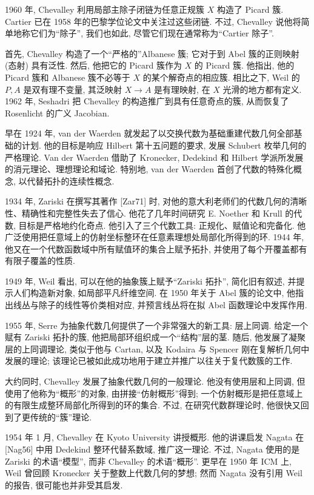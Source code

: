 1960 年, Chevalley 利用局部主除子闭链为任意正规簇 $X$ 构造了 Picard 簇. Cartier 已在 1958 年的巴黎学位论文中关注过这些闭链. 不过, Chevalley 说他将简单地称它们为“除子”, 我们也如此, 尽管它们现在通常称为“Cartier 除子”.

首先, Chevalley 构造了一个“严格的”Albanese 簇; 它对于到 Abel 簇的正则映射 (态射) 具有泛性. 然后, 他把它的 Picard 簇作为 $X$ 的 Picard 簇. 他指出, 他的 Picard 簇和 Albanese 簇不必等于 $X$ 的某个解奇点的相应簇. 相比之下, Weil 的 $P,A$ 是双有理不变量, 其泛映射 $X\to A$ 是有理映射, 在 $X$ 光滑的地方都有定义. 1962 年, Seshadri 把 Chevalley 的构造推广到具有任意奇点的簇, 从而恢复了 Rosenlicht 的广义 Jacobian.

早在 1924 年, van der Waerden 就发起了以交换代数为基础重建代数几何全部基础的计划. 他的目标是响应 Hilbert 第十五问题的要求, 发展 Schubert 枚举几何的严格理论. Van der Waerden 借助了 Kronecker, Dedekind 和 Hilbert 学派所发展的消元理论、理想理论和域论. 特别地, van der Waerden 首创了代数的特殊化概念, 以代替拓扑的连续性概念.

1934 年, Zariski 在撰写其著作 [Zar71] 时, 对他的意大利老师们的代数几何的清晰性、精确性和完整性失去了信心. 他花了几年时间研究 E. Noether 和 Krull 的代数, 目标是严格地约化奇点. 他引入了三个代数工具: 正规化、赋值论和完备化. 他广泛使用把任意域上的仿射坐标整环在任意素理想处局部化所得到的环. 1944 年, 他又在一个代数函数域中所有赋值环的集合上赋予拓扑, 并使用了每个开覆盖都有有限子覆盖的性质.

1949 年, Weil 看出, 可以在他的抽象簇上赋予“Zariski 拓扑”, 简化旧有叙述, 并提示人们构造新对象, 如局部平凡纤维空间. 在 1950 年关于 Abel 簇的论文中, 他指出线丛与除子的线性等价类相对应, 并预言线丛将在拟 Abel 函数理论中发挥作用.

1955 年, Serre 为抽象代数几何提供了一个非常强大的新工具: 层上同调. 给定一个赋有 Zariski 拓扑的簇, 他把局部环组织成一个“结构”层的茎. 随后, 他发展了凝聚层的上同调理论, 类似于他与 Cartan, 以及 Kodaira 与 Spencer 刚在复解析几何中发展的理论; 该理论已被如此成功地用于建立并推广以往关于复代数簇的工作.

大约同时, Chevalley 发展了抽象代数几何的一般理论. 他没有使用层和上同调, 但使用了他称为“概形”的对象, 由拼接“仿射概形”得到; 一个仿射概形是把任意域上的有限生成整环局部化所得到的环的集合. 不过, 在研究代数群理论时, 他很快又回到了更传统的“簇”理论.

1954 年 1 月, Chevalley 在 Kyoto University 讲授概形. 他的讲课启发 Nagata 在 [Nag56] 中用 Dedekind 整环代替系数域, 推广这一理论. 不过, Nagata 使用的是 Zariski 的术语“模型”, 而非 Chevalley 的术语“概形”. 更早在 1950 年 ICM 上, Weil 曾回顾 Kronecker 关于整数上代数几何的梦想; 然而 Nagata 没有引用 Weil 的报告, 很可能也并非受其启发.

